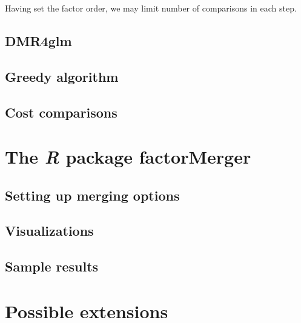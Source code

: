 \documentclass[11pt,]{article}
\begin{document}
Having set the factor order, we may limit number of comparisons in each
step.

\subsection{DMR4glm}\label{dmr4glm}

\subsection{Greedy algorithm}\label{greedy-algorithm}

\subsection{Cost comparisons}\label{cost-comparisons}

\section{\texorpdfstring{The \emph{R} package
\textbf{factorMerger}}{The R package factorMerger}}\label{the-r-package-factormerger}

\subsection{Setting up merging
options}\label{setting-up-merging-options}

\subsection{Visualizations}\label{visualizations}

\subsection{Sample results}\label{sample-results}

\section{Possible extensions}\label{possible-extensions}

\newpage
\singlespacing 
\renewcommand\refname{Bibliography}

\end{document}
